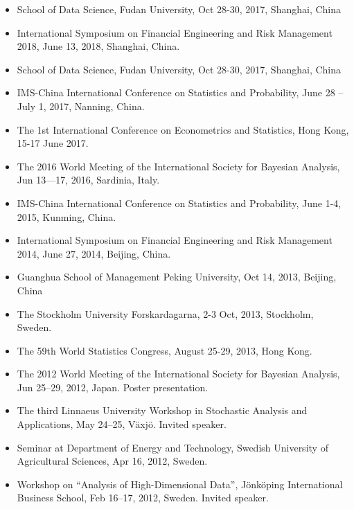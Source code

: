 \documentclass[twoside,a4paper]{article}
\begin{document}
\begin{itemize}
\item School of Data Science, Fudan University, Oct 28-30, 2017, Shanghai, China

\item International Symposium on Financial Engineering and Risk Management 2018, June 13, 2018, Shanghai, China.

\item School of Data Science, Fudan University, Oct 28-30, 2017, Shanghai, China

\item IMS-China International Conference on Statistics and Probability, June 28 – July 1, 2017, Nanning, China.

\item The 1st International Conference on Econometrics and Statistics, Hong Kong, 15-17 June 2017.

\item The 2016 World Meeting of the International Society for Bayesian Analysis, Jun 13—17, 2016, Sardinia, Italy.

\item IMS-China International Conference on Statistics and Probability, June 1-4, 2015, Kunming, China.

\item International Symposium on Financial Engineering and Risk Management 2014, June 27, 2014, Beijing, China.

\item Guanghua School of Management Peking University, Oct 14, 2013, Beijing, China

\item The Stockholm University Forskardagarna, 2-3 Oct, 2013, Stockholm, Sweden.

\item The 59th World Statistics Congress, August 25-29, 2013, Hong Kong.

\item The 2012 World Meeting of the International Society for Bayesian Analysis, Jun 25--29, 2012, Japan. Poster presentation.

\item The third Linnaeus University Workshop in Stochastic Analysis and Applications, May 24--25, Växjö. Invited speaker.

\item Seminar at Department of Energy and Technology, Swedish University of Agricultural Sciences, Apr 16, 2012, Sweden.

\item Workshop on ``Analysis of High-Dimensional Data'', Jönköping International Business School, Feb 16--17, 2012, Sweden. Invited speaker.


\end{itemize}
\end{document}
